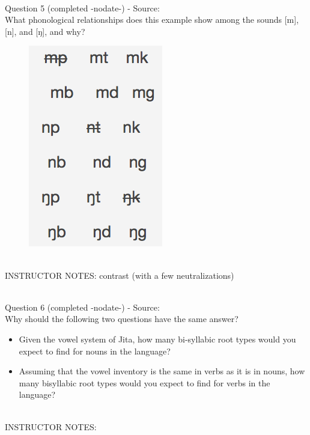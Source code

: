 \documentclass[12pt]{article}
\begin{document}
~\\

{\large Question 5} (completed -nodate-) - Source: \\

What phonological relationships does this example show among the sounds [m], [n], and [ŋ], and why?\\

\begin{figure}[H]
\includegraphics{../images/quiz4question5_d.png}
\end{figure}

~\\
INSTRUCTOR NOTES: contrast (with a few neutralizations)


~\\

{\large Question 6} (completed -nodate-) - Source: \\

Why should the following two questions have the same answer?\\

\begin{itemize} \item Given the vowel system of Jita, how many bi-syllabic root types would you expect to find for nouns in the language? \item Assuming that the vowel inventory is the same in verbs as it is in nouns, how many bisyllabic root types would you expect to find for verbs in the language? \end{itemize}


~\\
INSTRUCTOR NOTES: 


~\\
\end{document}
